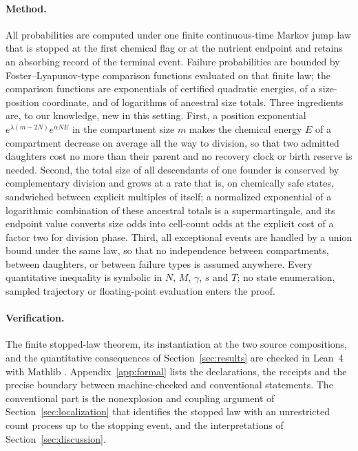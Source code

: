 \documentclass[11pt,a4paper]{article}
\theoremstyle{plain}
\theoremstyle{definition}
\theoremstyle{remark}
\begin{document}
\paragraph{Method.}
All probabilities are computed under one finite continuous-time Markov jump law \citep{kurtz1972,gillespie1977,andersonkurtz2015} that is stopped at the first chemical flag or at the nutrient endpoint and retains an absorbing record of the terminal event. Failure probabilities are bounded by Foster--Lyapunov-type comparison functions \citep{meyntweedie1993,gupta2014,kuntz2019} evaluated on that finite law; the comparison functions are exponentials of certified quadratic energies, of a size-position coordinate, and of logarithms of ancestral size totals. Three ingredients are, to our knowledge, new in this setting. First, a position exponential $e^{\lambda(m-2N)}e^{\alpha NE}$ in the compartment size $m$ makes the chemical energy $E$ of a compartment decrease on average all the way to division, so that two admitted daughters cost no more than their parent and no recovery clock or birth reserve is needed. Second, the total size of all descendants of one founder is conserved by complementary division and grows at a rate that is, on chemically safe states, sandwiched between explicit multiples of itself; a normalized exponential of a logarithmic combination of these ancestral totals is a supermartingale, and its endpoint value converts size odds into cell-count odds at the explicit cost of a factor two for division phase. Third, all exceptional events are handled by a union bound under the same law, so that no independence between compartments, between daughters, or between failure types is assumed anywhere. Every quantitative inequality is symbolic in $N$, $M$, $\gamma$, $s$ and $T$; no state enumeration, sampled trajectory or floating-point evaluation enters the proof.

\paragraph{Verification.}
The finite stopped-law theorem, its instantiation at the two source compositions, and the quantitative consequences of Section~\ref{sec:results} are checked in Lean~4 with Mathlib \citep{demoura2021,mathlib2020}. Appendix~\ref{app:formal} lists the declarations, the receipts and the precise boundary between machine-checked and conventional statements. The conventional part is the nonexplosion and coupling argument of Section~\ref{sec:localization} that identifies the stopped law with an unrestricted count process up to the stopping event, and the interpretations of Section~\ref{sec:discussion}.
\end{document}

